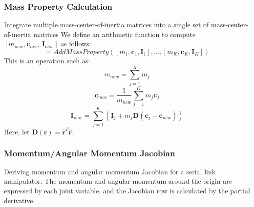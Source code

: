 \subsubsection{Mass Property Calculation}
Integrate multiple mass-center-of-inertia matrices into a single set of mass-center-of-inertia matrices
We define an arithmetic function to compute $[m_{new}, \bm{c}_{new}, \bm{I}_{new}]$ as follows:
\begin{equation}
[m_{new}, \bm{c}_{new}, \bm{I}_{new}]
= AddMassProperty(
[m_{1}, \bm{c}_{1}, \bm{I}_{1}]
,\hdots,
[m_{K}, \bm{c}_{K}, \bm{I}_{K}]
)
\end{equation}
This is an operation such as:
\begin{equation}
m_{new} = \sum_{j=1}^{K}m_{j}
\end{equation}
\begin{equation}
\bm{c}_{new} = \frac{1}{m_{new}}\sum_{j=1}^{K} m_j \bm{c}_j
\end{equation}
\begin{equation}
\bm{I}_{new} = \sum_{j=1}^{K}
\left(
\bm{I}_j + m_j \bm{D}(\bm{c}_{j} - \bm{c}_{new})
\right)
\end{equation}
Here, let $\bm{D}(\bm{r})=\hat{\bm{r}}^T\hat{\bm{r}}$.

\subsubsection{Momentum/Angular Momentum Jacobian}
Deriving momentum and angular momentum Jacobian for a serial link manipulator.
The momentum and angular momentum around the origin are expressed by each joint variable, and the Jacobian row is calculated by the partial derivative.

